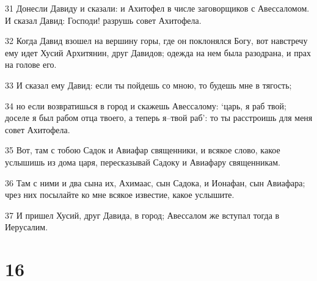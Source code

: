 \par 31 Донесли Давиду и сказали: и Ахитофел в числе заговорщиков с Авессаломом. И сказал Давид: Господи! разрушь совет Ахитофела.
\par 32 Когда Давид взошел на вершину горы, где он поклонялся Богу, вот навстречу ему идет Хусий Архитянин, друг Давидов; одежда на нем была разодрана, и прах на голове его.
\par 33 И сказал ему Давид: если ты пойдешь со мною, то будешь мне в тягость;
\par 34 но если возвратишься в город и скажешь Авессалому: `царь, я раб твой; доселе я был рабом отца твоего, а теперь я--твой раб': то ты расстроишь для меня совет Ахитофела.
\par 35 Вот, там с тобою Садок и Авиафар священники, и всякое слово, какое услышишь из дома царя, пересказывай Садоку и Авиафару священникам.
\par 36 Там с ними и два сына их, Ахимаас, сын Садока, и Ионафан, сын Авиафара; чрез них посылайте ко мне всякое известие, какое услышите.
\par 37 И пришел Хусий, друг Давида, в город; Авессалом же вступал тогда в Иерусалим.

\chapter{16}

